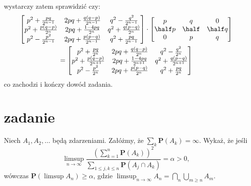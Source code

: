 \documentclass[11pt]{scrartcl}
\begin{document}
    wystarczy zatem sprawidzić czy:
    \begin{gather*}
        \begin{bmatrix}
                p^2 + \frac{pq}{2^{n-1}} & 2pq + \frac{q(q-p)}{2^{n-1}} & q^2 - \frac{q^2}{2^{n-1}} \\
                p^2 + \frac{p(q-p)}{2^n} & 2pq + \frac{1 - 4pq}{2^n} & q^2 + \frac{q(p-q)}{2^n} \\
                p^2 - \frac{p^2}{2^{n-1}} & 2pq + \frac{p(p - q)}{2^{n-1}} & q^2 + \frac{pq}{2^{n-1}}
        \end{bmatrix}
        \cdot 
        \begin{bmatrix}
            p       & q     & 0       \\
            \half p & \half & \half q \\
            0       & p     & q
        \end{bmatrix} \\
        =
        \begin{bmatrix}
                p^2 + \frac{pq}{2^{n}} & 2pq + \frac{q(q-p)}{2^{n}} & q^2 - \frac{q^2}{2^{n}} \\
                p^2 + \frac{p(q-p)}{2^{n+1}} & 2pq + \frac{1 - 4pq}{2^{n+1}} & q^2 + \frac{q(p-q)}{2^{n+1}} \\
                p^2 - \frac{p^2}{2^{n}} & 2pq + \frac{p(p - q)}{2^{n}} & q^2 + \frac{pq}{2^{n}}
        \end{bmatrix}
    \end{gather*}
    co zachodzi i kończy dowód zadania.

    \vspace{2cm}

    \section{zadanie}

    \begin{zadanie*}
        Niech \( A_1, A_2, \dots \) będą zdarzeniami. 
        Załóżmy, że \( \sum_k \mathbf{P}(A_k) = \infty \). Wykaż, że jeśli
        \[
            \limsup_{n \to \infty} 
                \frac{\left( \sum_{k=1}^{n} \mathbf{P}(A_k) \right)^2}
                {\sum_{1 \leq j, k \leq n} \mathbf{P}(A_j \cap A_k)} 
                = \alpha > 0,
        \]
        wówczas \( \mathbf{P} (\limsup A_n) \geq \alpha \), 
        gdzie \( \limsup_{n \to \infty} A_n = \bigcap_n \bigcup_{m \geq n} A_m \).
    \end{zadanie*}
\end{document}

